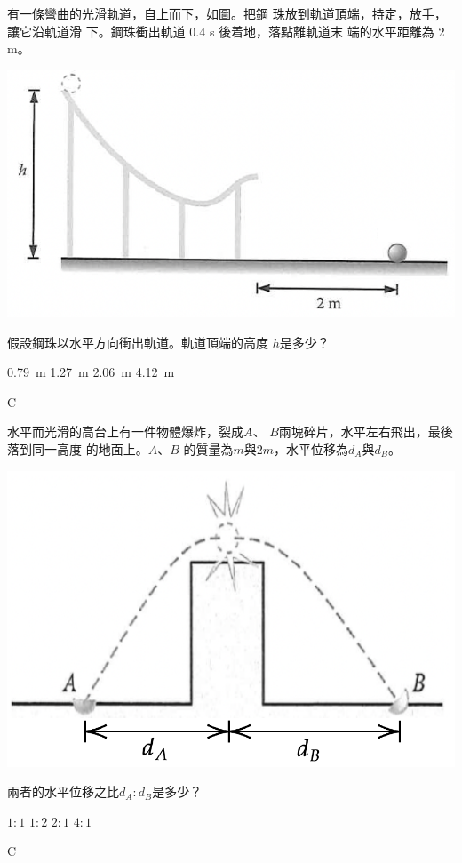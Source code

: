 {
有一條彎曲的光滑軌道，自上而下，如圖。把鋼 珠放到軌道頂端，持定，放手，讓它沿軌道滑 下。鋼珠衝出軌道 0.4 s 後着地，落點離軌道末 端的水平距離為 2 m。
{\par\centering
\includegraphics[width=0.45\linewidth]{assets/sasd.png}
\par
}

假設鋼珠以水平方向衝出軌道。軌道頂端的高度 $h$是多少？
\begin{tasks}
    \task \qty{0.79}{m}
    \task \qty{1.27}{m}
    \task \qty{2.06}{m}
    \task \qty{4.12}{m}
\end{tasks}
}{C}

{
    水平而光滑的高台上有一件物體爆炸，裂成$A$、 $B$兩塊碎片，水平左右飛出，最後落到同一高度 的地面上。$A$、$B$ 的質量為$m$與$2m$，水平位移為$d_A$與$d_B$。
    \par{\par\centering\includegraphics[width=.4\textwidth]{./img/ch6_projectile_mc_2024-05-12-16-19-49.png}\par}
    \par 兩者的水平位移之比$d_A:d_B$是多少？
    \begin{tasks}
        \task $1:1$
        \task $1:2$
        \task $2:1$
        \task $4:1$
    \end{tasks}
}{C}